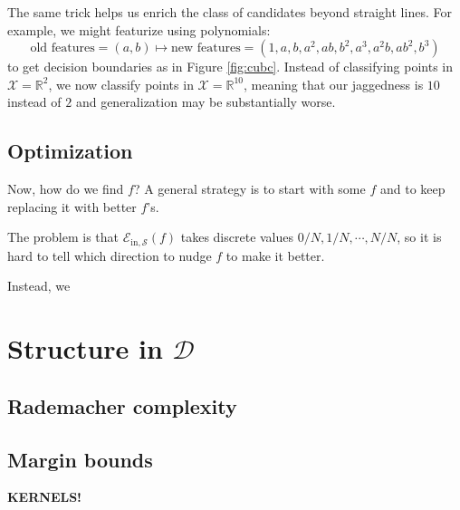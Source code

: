 \documentclass[openany, notitlepage, justified]{tufte-book}
\newcommand{\RR}{\mathbb{R}}
\newcommand{\Dd}{\mathcal{D}}
\newcommand{\Ee}{\mathcal{E}}
\newcommand{\Ss}{\mathcal{S}}
\newcommand{\Xx}{\mathcal{X}}
\newcommand{\Ein}{\Ee_{\text{in},\Ss}}
\begin{document}
            The same trick helps us enrich the class of candidates beyond
            straight lines.  For example, we might featurize using
            polynomials: 
            $$
                \text{old features} = (a, b)
                \mapsto
                \text{new features} = (1, a, b, a^2, ab, b^2, a^3, a^2b, ab^2, b^3)
            $$
            to get decision boundaries as in Figure \ref{fig:cubc}.
            Instead of classifying points in $\Xx=\RR^2$, we
            now classify points in $\Xx=\RR^{10}$, meaning that our jaggedness
            is $10$ instead of $2$ and generalization may be substantially
            worse.



            \newpage
        \section{Optimization}

            Now, how do we find $f$?  A general strategy is to start with
            some $f$ and to keep replacing it with better $f$'s.

            The problem is that $\Ein(f)$ takes discrete values $0/N, 1/N,
            \cdots, N/N$, so it is hard to tell which direction to nudge $f$ to
            make it better.

            Instead, we 

    \newpage
    \chapter{Structure in $\Dd$}
        \section{Rademacher complexity}
        \section{Margin bounds}
            {\bf KERNELS!}

\end{document}
